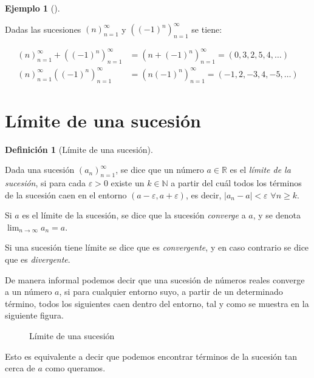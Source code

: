 \documentclass[
  a4paper,
]{scrreport}
\theoremstyle{definition}
\newtheorem{example}{Ejemplo}[chapter]
\theoremstyle{plain}
\theoremstyle{definition}
\newtheorem{definition}{Definición}[chapter]
\theoremstyle{definition}
\theoremstyle{plain}
\theoremstyle{plain}
\theoremstyle{remark}
\begin{document}
\begin{example}[]\protect\hypertarget{exm-operaciones-sucesiones}{}\label{exm-operaciones-sucesiones}

Dadas las sucesiones \((n)_{n=1}^\infty\) y \(((-1)^n)_{n=1}^\infty\) se
tiene:

\begin{align*}
(n)_{n=1}^\infty + ((-1)^n)_{n=1}^\infty &= (n + (-1)^n)_{n=1}^\infty = (0, 3, 2, 5, 4, \ldots)\\
(n)_{n=1}^\infty ((-1)^n)_{n=1}^\infty &= (n (-1)^n)_{n=1}^\infty = (-1, 2, -3, 4, -5, \ldots)
\end{align*}

\end{example}

\section{Límite de una sucesión}\label{luxedmite-de-una-sucesiuxf3n}

\begin{definition}[Límite de una
sucesión]\protect\hypertarget{def-limite-sucesion}{}\label{def-limite-sucesion}

Dada una sucesión \((a_n)_{n=1}^\infty\), se dice que un número
\(a\in\mathbb{R}\) es el \emph{límite de la sucesión}, si para cada
\(\varepsilon>0\) existe un \(k\in\mathbb{N}\) a partir del cuál todos
los términos de la sucesión caen en el entorno
\((a-\varepsilon, a+\varepsilon)\), es decir, \(|a_n-a|<\varepsilon\)
\(\forall n\geq k\).

Si \(a\) es el límite de la sucesión, se dice que la sucesión
\emph{converge} a \(a\), y se denota \(\lim_{n\to\infty}a_n = a\).

\end{definition}

Si una sucesión tiene límite se dice que es \emph{convergente}, y en
caso contrario se dice que es \emph{divergente}.

De manera informal podemos decir que una sucesión de números reales
converge a un número \(a\), si para cualquier entorno suyo, a partir de
un determinado término, todos los siguientes caen dentro del entorno,
tal y como se muestra en la siguiente figura.

\begin{figure}
\centering

\caption{Límite de una sucesión}
\end{figure}

Esto es equivalente a decir que podemos encontrar términos de la
sucesión tan cerca de \(a\) como queramos.
\end{document}
